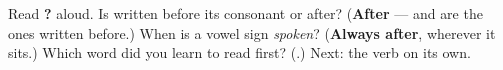 \begin{tcolorbox}[breakable,colback=teal!4,colframe=teal!35!black,title={Before you move on}]
Read \textbf{  ?} aloud. Is \textbf{} written before its consonant or after? (\textbf{After} — \textbf{} and \textbf{} are the ones written before.) When is a vowel sign \emph{spoken}? (\textbf{Always after}, wherever it sits.) Which word did you learn to read first? (\textbf{}.) Next: the verb  on its own.
\end{tcolorbox}
